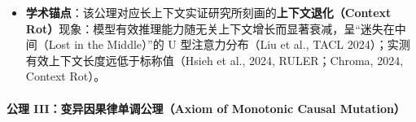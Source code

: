 \begin{itemize}
  B.11）。\textbf{违约概率的传导边界（E4，2026-10-20）}：定理中的
  \(P_{\text{violate}}(\rho) = 1 - \operatorname{snr}(\rho)/\operatorname{snr}(0)\)
  是\textbf{信噪比相对损失}，不是任务失败概率。E4
  端到端实验（Qwen2.5-1.5B/7B needle 检索正确率与 E3 SNR
  对齐）表明两者之间存在\textbf{补偿阈值 \(W^*\)}：\(\rho < W^*\)
  时模型的补偿机制（注意力 sink、KV cache 策略、长上下文训练对齐）抵消
  SNR 衰减，任务正确率 \(\approx\) 100\%；\(\rho > W^*\)
  时补偿失效，正确率陡降。实测
  \(W^*_{1.5\text{B}} \approx 32\text{k–64k} < W^*_{7\text{B}} > 131\text{k} < W^*_{\text{Kimi}} \ge 1\text{M}\)，与模型能力正相关。\textbf{违约下界
  \(P_{\text{violate}} \ge 1 - c^n\) 只在 \(\rho > W^*\)
  时传导为可观测的任务失败}；\(\rho < W^*\) 时 SNR 虽已衰减（7B 在 131k
  处 SNR 损失 44\%），但任务正确率不受影响。\(W^*\)
  是经验参数，不写入形式化接口。认识论边界见附录 B.11。
\item
  \textbf{学术锚点}：该公理对应长上下文实证研究所刻画的\textbf{上下文退化（Context
  Rot）}现象：模型有效推理能力随无关上下文增长而显著衰减，呈``迷失在中间（Lost
  in the Middle）''的 U 型注意力分布（Liu et al., TACL
  2024）；实测有效上下文长度远低于标称值（Hsieh et al., 2024,
  RULER；Chroma, 2024, Context Rot）。
\end{itemize}

\paragraph{公理 III：变异因果律单调公理（Axiom of Monotonic Causal
Mutation）}\label{ux516cux7406-iiiux53d8ux5f02ux56e0ux679cux5f8bux5355ux8c03ux516cux7406axiom-of-monotonic-causal-mutation}

